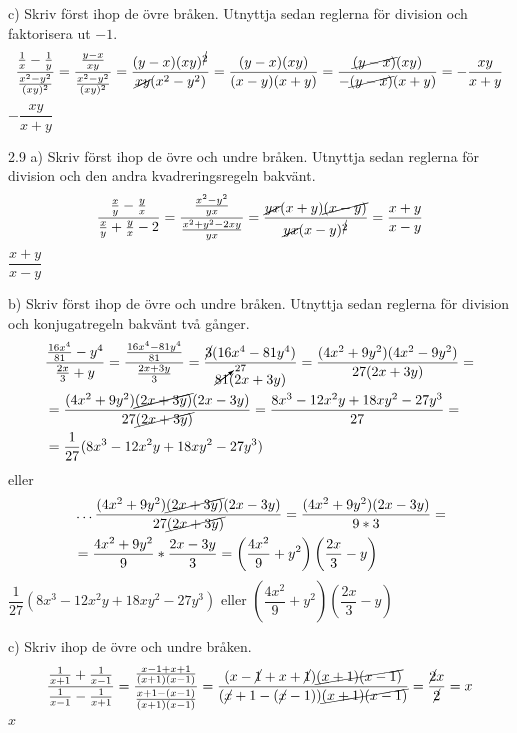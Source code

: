 \begin{task}{c)}
	Skriv först ihop de övre bråken. Utnyttja sedan reglerna för division och faktorisera ut $-1$.
	\[\dfrac{\frac{1}{x}-\frac{1}{y}}{\frac{x^2-y^2}{(xy)^2}}=
	\dfrac{\frac{y-x}{xy}}{\frac{x^2-y^2}{(xy)^2}}=
	\dfrac{(y-x)(xy)^{\cancel{2}}}{\cancel{xy}(x^2-y^2)}=
	\dfrac{(y-x)(xy)}{(x-y)(x+y)}=
	\dfrac{\cancel{(y-x)}(xy)}{-\cancel{(y-x)}(x+y)}=
	-\dfrac{xy}{x+y}\]
	\ans $-\dfrac{xy}{x+y}$
\end{task}

\begin{task}{2.9 a)}
	Skriv först ihop de övre och undre bråken. Utnyttja sedan reglerna för division och den andra kvadreringsregeln bakvänt.
	\[\dfrac{\frac{x}{y}- \frac{y}{x}}{\frac{x}{y}+\frac{y}{x}-2}=
	\dfrac{\frac{x^2-y^2}{yx}}{\frac{x^2+y^2-2xy}{yx}}=
	\dfrac{\cancel{yx}(x+y)\cancel{(x-y)}}{\cancel{yx}(x-y)^{\cancel{2}}}=
	\dfrac{x+y}{x-y}\]
	\ans $\dfrac{x+y}{x-y}$
\end{task}

\begin{task}{b)}
	Skriv först ihop de övre och undre bråken. Utnyttja sedan reglerna för division och konjugatregeln bakvänt två gånger.
	\begin{align*}
	&\dfrac{\frac{16x^4}{81}-y^4}{\frac{2x}{3}+y}=
	\dfrac{\frac{16x^4-81y^4}{81}}{\frac{2x+3y}{3}}=
	\dfrac{\cancel{3}(16x^4-81y^4)}{\cancelto{27}{81}(2x+3y)}= 
	\dfrac{(4x^2+9y^2)(4x^2-9y^2)}{27(2x+3y)}=\\
	&=\dfrac{(4x^2+9y^2)\cancel{(2x+3y)}(2x-3y)}{27\cancel{(2x+3y)}}=
	\dfrac{8x^3-12x^2y+18xy^2-27y^3}{27}= \\
	&=\dfrac{1}{27}(8x^3-12x^2y+18xy^2-27y^3)
	\end{align*}
	eller
	\begin{align*}
	&\ldots\dfrac{(4x^2+9y^2)\cancel{(2x+3y)}(2x-3y)}{27\cancel{(2x+3y)}}=
	\dfrac{(4x^2+9y^2)(2x-3y)}{9*3}= \\
	&=\dfrac{4x^2+9y^2}{9}*\dfrac{2x-3y}{3}=
	\left(\dfrac{4x^2}{9}+y^2\right)\left(\dfrac{2x}{3}-y\right)
	\end{align*}
	\ans $\dfrac{1}{27}(8x^3-12x^2y+18xy^2-27y^3)$ eller $\left(\dfrac{4x^2}{9}+y^2\right)\left(\dfrac{2x}{3}-y\right)$
\end{task}

\begin{task}{c)}
	Skriv ihop de övre och undre bråken.
	\[\dfrac{\frac{1}{x+1}+\frac{1}{x-1}}{\frac{1}{x-1}-\frac{1}{x+1}}=
	\dfrac{\frac{x-1+x+1}{(x+1)(x-1)}}{\frac{x+1-(x-1)}{(x+1)(x-1)}}=
	\dfrac{(x-\cancel{1}+x+\cancel{1})\cancel{(x+1)(x-1)}}{(\cancel{x}+1-(\cancel{x}-1))\cancel{(x+1)(x-1)}}=
	\dfrac{\cancel{2}x}{\cancel{2}}=
	x\]
	\ans $x$
\end{task}

